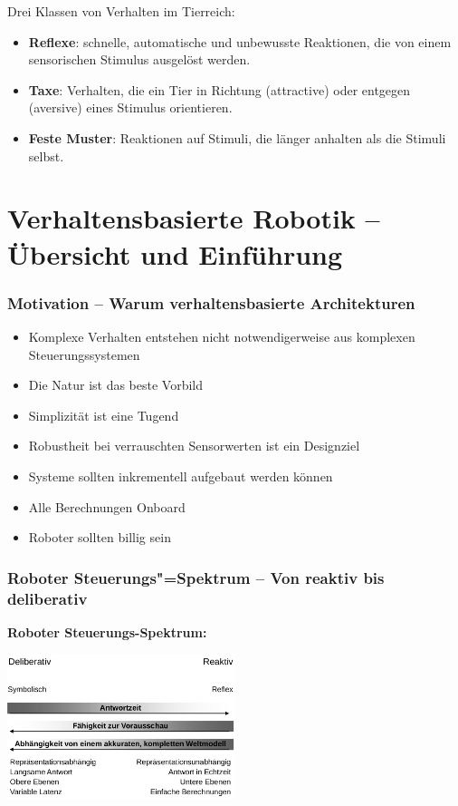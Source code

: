Drei Klassen von Verhalten im Tierreich:
\begin{itemize}
	\item \textbf{Reflexe}: schnelle, automatische und unbewusste Reaktionen, die von einem sensorischen Stimulus ausgelöst werden.
	\item \textbf{Taxe}: Verhalten, die ein Tier in Richtung (attractive) oder entgegen (aversive) eines Stimulus orientieren.
	\item \textbf{Feste Muster}: Reaktionen auf Stimuli, die länger anhalten als die Stimuli selbst.
\end{itemize}

\section{Verhaltensbasierte Robotik -- Übersicht  und Einführung}

\subsubsection{Motivation -- Warum verhaltensbasierte Architekturen}
\begin{itemize}
	\item Komplexe Verhalten entstehen nicht notwendigerweise aus komplexen Steuerungssystemen
	\item Die Natur ist das beste Vorbild
	\item Simplizität ist eine Tugend
	\item Robustheit bei verrauschten Sensorwerten ist ein Designziel
	\item Systeme sollten inkrementell aufgebaut werden können
	\item Alle Berechnungen Onboard
	\item Roboter sollten billig sein
\end{itemize}

\subsubsection{Roboter Steuerungs"=Spektrum -- Von reaktiv bis deliberativ}
\textbf{Roboter Steuerungs-Spektrum:}
\begin{center}
	\includegraphics[width=0.5\textwidth]{figures/steuerungs_spektrum.png}
\end{center}

